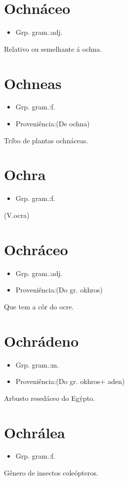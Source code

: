\section{Ochnáceo}
\begin{itemize}
\item {Grp. gram.:adj.}
\end{itemize}
Relativo ou semelhante á ochna.
\section{Ochneas}
\begin{itemize}
\item {Grp. gram.:f.}
\end{itemize}
\begin{itemize}
\item {Proveniência:(De \textunderscore ochna\textunderscore )}
\end{itemize}
Tríbo de plantas ochnáceas.
\section{Ochra}
\begin{itemize}
\item {Grp. gram.:f.}
\end{itemize}
(V.ocra)
\section{Ochráceo}
\begin{itemize}
\item {Grp. gram.:adj.}
\end{itemize}
\begin{itemize}
\item {Proveniência:(Do gr. \textunderscore okhros\textunderscore )}
\end{itemize}
Que tem a côr do ocre.
\section{Ochrádeno}
\begin{itemize}
\item {Grp. gram.:m.}
\end{itemize}
\begin{itemize}
\item {Proveniência:(Do gr. \textunderscore okhros\textunderscore  + \textunderscore aden\textunderscore )}
\end{itemize}
Arbusto resedáceo do Egýpto.
\section{Ochrálea}
\begin{itemize}
\item {Grp. gram.:f.}
\end{itemize}
Gênero de insectos coleópteros.
